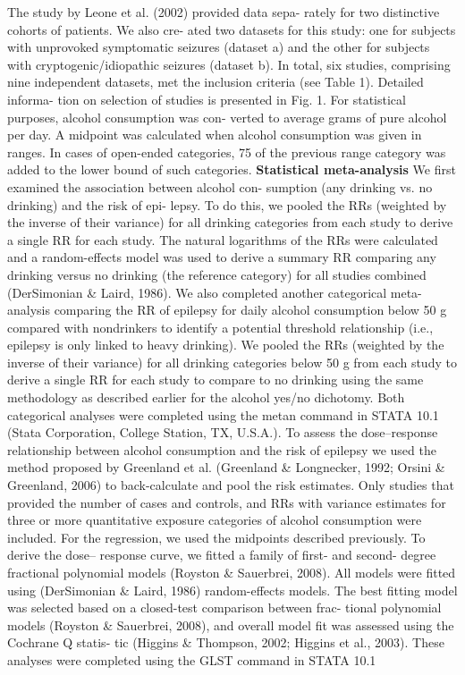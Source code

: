 \documentclass{article}
\begin{document}
The study by Leone et al. (2002) provided data sepa-
rately for two distinctive cohorts of patients. We also cre-
ated two datasets for this study: one for subjects with
unprovoked symptomatic seizures (dataset a) and the other
for subjects with cryptogenic/idiopathic seizures (dataset b).
In total, six studies, comprising nine independent datasets,
met the inclusion criteria (see Table 1). Detailed informa-
tion on selection of studies is presented in Fig. 1.
For statistical purposes, alcohol consumption was con-
verted to average grams of pure alcohol per day. A midpoint
was calculated when alcohol consumption was given in
ranges. In cases of open-ended categories, 75%
of the previous range category was added to the lower bound
of such categories.
\textbf{Statistical meta-analysis}
We first examined the association between alcohol con-
sumption (any drinking vs. no drinking) and the risk of epi-
lepsy. To do this, we pooled the RRs (weighted by the
inverse of their variance) for all drinking categories from
each study to derive a single RR for each study. The natural
logarithms of the RRs were calculated and a random-effects
model was used to derive a summary RR comparing any
drinking versus no drinking (the reference category) for all
studies combined (DerSimonian \& Laird, 1986).
We also completed another categorical meta-analysis
comparing the RR of epilepsy for daily alcohol consumption
below 50 g compared with nondrinkers to identify a potential
threshold relationship (i.e., epilepsy is only linked to heavy
drinking). We pooled the RRs (weighted by the inverse of
their variance) for all drinking categories below 50 g from
each study to derive a single RR for each study to compare to
no drinking using the same methodology as described earlier
for the alcohol yes/no dichotomy. Both categorical analyses
were completed using the metan command in STATA 10.1
(Stata Corporation, College Station, TX, U.S.A.).
To assess the dose–response relationship between alcohol
consumption and the risk of epilepsy we used the method
proposed by Greenland et al. (Greenland \& Longnecker,
1992; Orsini \& Greenland, 2006) to back-calculate and pool
the risk estimates. Only studies that provided the number of
cases and controls, and RRs with variance estimates for
three or more quantitative exposure categories of alcohol
consumption were included. For the regression, we used the
midpoints described previously. To derive the dose–
response curve, we fitted a family of first- and second-
degree fractional polynomial models (Royston \& Sauerbrei,
2008). All models were fitted using (DerSimonian \& Laird,
1986) random-effects models. The best fitting model was
selected based on a closed-test comparison between frac-
tional polynomial models (Royston \& Sauerbrei, 2008), and
overall model fit was assessed using the Cochrane Q statis-
tic (Higgins \& Thompson, 2002; Higgins et al., 2003).
These analyses were completed using the GLST command
in STATA 10.1
\end{document}
